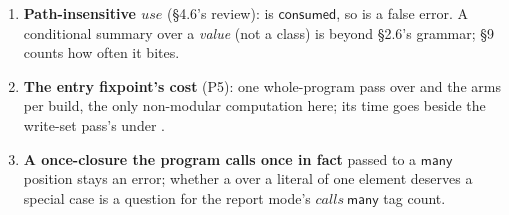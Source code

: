 \begin{enumerate}
\item \textbf{Path-insensitive $\mathit{use}$} (§4.6's review):  is $\mathsf{consumed}$, so  is a false error. A conditional summary over a \emph{value} (not a class) is beyond §2.6's grammar; §9 counts how often it bites.
\item \textbf{The entry fixpoint's cost} (P5): one whole-program pass over  and the arms per build, the only non-modular computation here; its time goes beside the write-set pass's under .
\item \textbf{A once-closure the program calls once in fact} passed to a $\mathsf{many}$ position stays an error; whether a  over a literal of one element deserves a special case is a question for the report mode's $\mathit{calls}\ \mathsf{many}$ tag count.
\end{enumerate}
